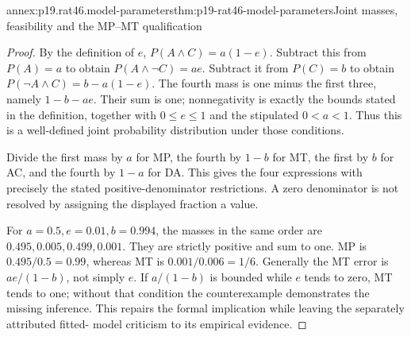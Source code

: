 \begin{annexitem}{annex:p19.rat46.model-parameters}{thm:p19-rat46-model-parameters}{Joint masses, feasibility and the MP--MT qualification}
\begin{proof}
By the definition of \(e\), \(P(A\land C)=a(1-e)\).
Subtract this from \(P(A)=a\) to obtain \(P(A\land\neg C)=ae\).
Subtract it from \(P(C)=b\) to obtain \(P(\neg A\land C)=b-a(1-e)\).
The fourth mass is one minus the first three, namely \(1-b-ae\).
Their sum is one; nonnegativity is exactly the bounds stated in the
definition, together with \(0\leq e\leq1\) and the stipulated
\(0<a<1\). Thus this is a well-defined joint probability distribution
under those conditions.

Divide the first mass by \(a\) for MP, the fourth by \(1-b\)
for MT, the first by \(b\) for AC, and the fourth by \(1-a\)
for DA. This gives the four expressions with precisely the stated
positive-denominator restrictions. A zero denominator is not resolved
by assigning the displayed fraction a value.

For \(a=0.5,e=0.01,b=0.994\), the masses in the same order are
\(0.495,0.005,0.499,0.001\). They are strictly positive and sum to
one. MP is \(0.495/0.5=0.99\), whereas MT is
\(0.001/0.006=1/6\). Generally the MT error is
\(ae/(1-b)\), not simply \(e\). If \(a/(1-b)\) is bounded
while \(e\) tends to zero, MT tends to one; without that condition
the counterexample demonstrates the missing inference. This repairs
the formal implication while leaving the separately attributed fitted-
model criticism to its empirical evidence.
\end{proof}
\end{annexitem}
